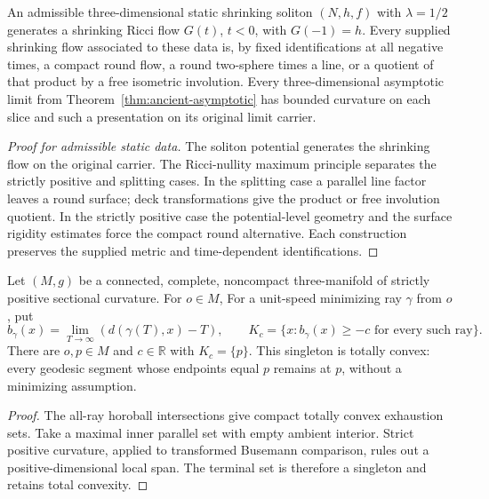 \begin{theorem}
\label{thm:three-shrinkers}
An admissible three-dimensional static shrinking soliton
$(N,h,f)$ with $\lambda=1/2$ generates a shrinking Ricci flow $G(t)$,
$t<0$, with $G(-1)=h$.
Every supplied shrinking flow associated to these data is, by fixed
identifications at all negative times, a compact round flow, a round
two-sphere times a line, or a quotient of that product by a free
isometric involution.
Every three-dimensional asymptotic limit from
Theorem~\ref{thm:ancient-asymptotic} has bounded curvature on each
slice and such a presentation on its original limit carrier.
\end{theorem}
\begin{proof}[Proof for admissible static data]
The soliton potential generates the shrinking flow on the original carrier.
The Ricci-nullity maximum principle separates the strictly positive and
splitting cases. In the splitting case a parallel line factor leaves a round
surface; deck transformations give the product or free involution quotient. In
the strictly positive case the potential-level geometry and the surface
rigidity estimates force the compact round alternative. Each construction
preserves the supplied metric and time-dependent identifications.
\end{proof}

\begin{lemma}
\label{lem:ancient-singleton-level}
Let $(M,g)$ be a connected, complete, noncompact three-manifold of
strictly positive sectional curvature. For $o\in M$,
For a unit-speed minimizing ray $\gamma$ from $o$, put
\[
 b_\gamma(x)=\lim_{T\to\infty}(d(\gamma(T),x)-T),\qquad
 K_c=\{x:b_\gamma(x)\geq-c\text{ for every such ray}\}.
\]
There are $o,p\in M$ and $c\in\mathbb R$ with $K_c=\{p\}$.
This singleton is totally convex: every geodesic segment whose
endpoints equal $p$ remains at $p$, without a minimizing assumption.
\end{lemma}
\begin{proof}
The all-ray horoball intersections give compact totally convex exhaustion
sets. Take a maximal inner parallel set with empty ambient interior. Strict
positive curvature, applied to transformed Busemann comparison, rules out a
positive-dimensional local span. The terminal set is therefore a singleton and
retains total convexity.
\end{proof}

